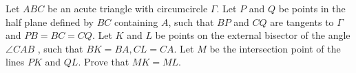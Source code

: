 Let $ABC$ be an acute triangle with circumcircle $\Gamma$. Let $P$ and $Q$ be points in the half plane defined by $BC$ containing $A$, such that $BP$ and $CQ$ are tangents to $\Gamma$ and $PB = BC = CQ$. Let $K$ and $L$ be points on the external bisector of the angle $\angle CAB$ , such that $BK = BA, CL = CA$. Let $M$ be the intersection point of the lines $PK$ and $QL$. Prove that $MK=ML$.